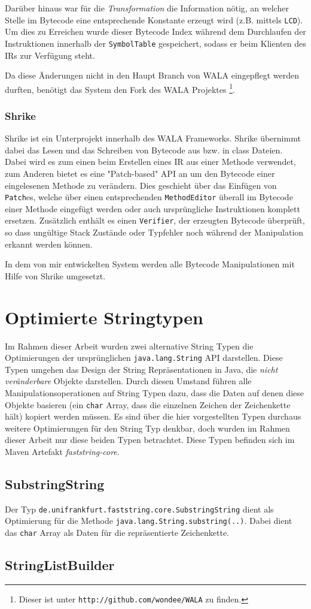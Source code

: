 Darüber hinaus war für die \textit{Transformation} die Information nötig, an welcher Stelle im Bytecode eine
entsprechende Konstante erzeugt wird (z.B. mittels \texttt{LCD}). Um dies zu Erreichen wurde dieser Bytecode 
Index während dem Durchlaufen der Instruktionen innerhalb der \texttt{SymbolTable} gespeichert, sodass er 
beim Klienten des IRs zur Verfügung steht.

Da diese Änderungen nicht in den Haupt Branch von WALA eingepflegt werden durften, benötigt das System den 
Fork des WALA Projektes \footnote{Dieser ist unter \texttt{http://github.com/wondee/WALA} zu finden.}.


\subsection{Shrike}

Shrike ist ein Unterprojekt innerhalb des WALA Frameworks. Shrike übernimmt dabei das Lesen und das 
Schreiben von Bytecode aus bzw. in class Dateien. Dabei wird es zum einen beim Erstellen eines IR aus einer 
Methode verwendet, zum Anderen bietet es eine "Patch-based" API an um den Bytecode einer eingelesenen 
Methode zu verändern. Dies geschieht über das Einfügen von \texttt{Patch}es, welche über einen 
entsprechenden \texttt{MethodEditor} überall im Bytecode einer Methode eingefügt werden oder auch 
ursprüngliche Instruktionen komplett ersetzen. Zusätzlich enthält es einen \texttt{Verifier}, der erzeugten 
Bytecode überprüft, so dass ungültige Stack Zustände oder Typfehler noch während der Manipulation erkannt 
werden können. 

In dem von mir entwickelten System werden alle Bytecode Manipulationen mit Hilfe von Shrike umgesetzt. 

\chapter{Optimierte Stringtypen}\label{stringLabels}

Im Rahmen dieser Arbeit wurden zwei alternative String Typen die Optimierungen der ursprünglichen
\texttt{java.lang.String} API darstellen. Diese Typen umgehen das Design der String Repräsentationen
in Java, die \textit{nicht veränderbare} Objekte darstellen. Durch diesen Umstand führen alle
Manipulationsoperationen auf String Typen dazu, dass die Daten auf denen diese Objekte basieren
(ein \texttt{char} Array, dass die einzelnen Zeichen der Zeichenkette hält) kopiert werden müssen.
Es sind über die hier vorgestellten Typen durchaus weitere Optimierungen für den String Typ denkbar, 
doch wurden im Rahmen dieser Arbeit nur diese beiden Typen betrachtet. Diese Typen befinden sich
im Maven Artefakt \textit{faststring-core}.

\section{SubstringString} 

Der Typ \texttt{de.unifrankfurt.faststring.core.SubstringString} dient als Optimierung für
die Methode \texttt{java.lang.String.substring(..)}. Dabei dient das \texttt{char} Array als
Daten für die repräsentierte Zeichenkette. 

\section{StringListBuilder} 
